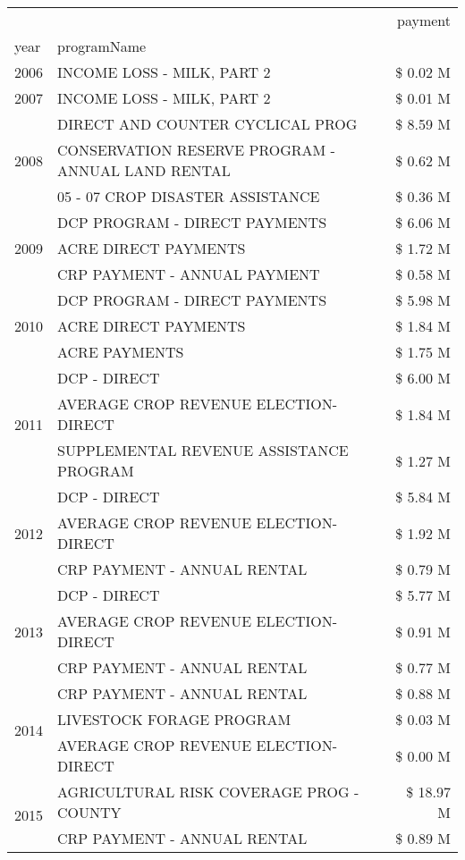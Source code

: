 \begin{tabular}{llr}
\toprule
 &  & payment \\
year & programName &  \\
\midrule
2006 & INCOME LOSS - MILK, PART 2 & \$ 0.02 M \\
\cline{1-3}
2007 & INCOME LOSS - MILK, PART 2 & \$ 0.01 M \\
\cline{1-3}
\multirow[t]{3}{*}{2008} & DIRECT AND COUNTER CYCLICAL PROG & \$ 8.59 M \\
 & CONSERVATION RESERVE PROGRAM - ANNUAL LAND RENTAL & \$ 0.62 M \\
 & 05 - 07 CROP DISASTER ASSISTANCE & \$ 0.36 M \\
\cline{1-3}
\multirow[t]{3}{*}{2009} & DCP PROGRAM - DIRECT PAYMENTS & \$ 6.06 M \\
 & ACRE DIRECT PAYMENTS & \$ 1.72 M \\
 & CRP PAYMENT - ANNUAL PAYMENT & \$ 0.58 M \\
\cline{1-3}
\multirow[t]{3}{*}{2010} & DCP PROGRAM - DIRECT PAYMENTS & \$ 5.98 M \\
 & ACRE DIRECT PAYMENTS & \$ 1.84 M \\
 & ACRE PAYMENTS & \$ 1.75 M \\
\cline{1-3}
\multirow[t]{3}{*}{2011} & DCP - DIRECT & \$ 6.00 M \\
 & AVERAGE CROP REVENUE ELECTION-DIRECT & \$ 1.84 M \\
 & SUPPLEMENTAL REVENUE ASSISTANCE PROGRAM & \$ 1.27 M \\
\cline{1-3}
\multirow[t]{3}{*}{2012} & DCP - DIRECT & \$ 5.84 M \\
 & AVERAGE CROP REVENUE ELECTION-DIRECT & \$ 1.92 M \\
 & CRP PAYMENT - ANNUAL RENTAL & \$ 0.79 M \\
\cline{1-3}
\multirow[t]{3}{*}{2013} & DCP - DIRECT & \$ 5.77 M \\
 & AVERAGE CROP REVENUE ELECTION-DIRECT & \$ 0.91 M \\
 & CRP PAYMENT - ANNUAL RENTAL & \$ 0.77 M \\
\cline{1-3}
\multirow[t]{3}{*}{2014} & CRP PAYMENT - ANNUAL RENTAL & \$ 0.88 M \\
 & LIVESTOCK FORAGE PROGRAM & \$ 0.03 M \\
 & AVERAGE CROP REVENUE ELECTION-DIRECT & \$ 0.00 M \\
\cline{1-3}
\multirow[t]{3}{*}{2015} & AGRICULTURAL RISK COVERAGE PROG - COUNTY & \$ 18.97 M \\
 & CRP PAYMENT - ANNUAL RENTAL & \$ 0.89 M \\

\end{tabular}
